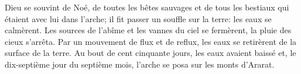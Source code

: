 Dieu se souvint de Noé,
	de toutes les bêtes sauvages et de tous les bestiaux
		qui étaient avec lui dans l’arche;
	il fit passer un souffle sur la terre: les eaux se calmèrent.
Les sources de l’abîme et les vannes du ciel se fermèrent, la pluie des cieux s’arrêta.
Par un mouvement de flux et de reflux, les eaux se retirèrent de la surface de la terre.
Au bout de cent cinquante jours, les eaux avaient baissé
	et, le dix-septième jour du septième mois, l’arche se posa sur les monts d’Ararat.
